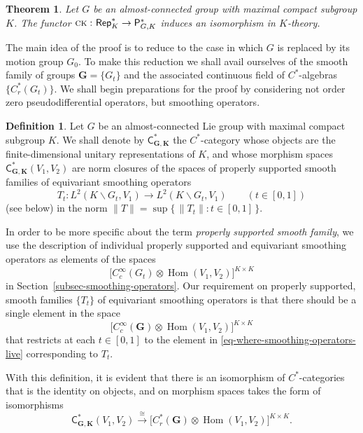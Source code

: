 \documentclass[leqno,11pt]{amsart}
\numberwithin{equation}{subsection}
\theoremstyle{plain}
\newtheorem{theorem}[equation]{Theorem}
\theoremstyle{definition}
\newtheorem{definition}[equation]{Definition}
\theoremstyle{remark}
\newcommand{\GG}{\pmb{G}}
\newcommand{\KK}{\pmb{K}}
\newcommand{\PSDO}{\mathsf{P}}
\newcommand{\CC}{\mathsf{C}}
\newcommand{\Rep}{\mathsf{Rep}}
\DeclareMathOperator{\Hom}{Hom}
\newcommand{\CoKa}{{\textsc{\textsf{ck}}}\,}
\begin{document}
\begin{theorem}
\label{thm-k-theory-of-the-c-star-category}
Let  $G$ be an almost-connected group with maximal compact subgroup $K$. The functor $\CoKa\colon \Rep^*_K \to \PSDO^*_{G,K}$ induces an isomorphism in $K$-theory.
\end{theorem}

The main idea of the proof is to reduce to the case in which  $G$   is replaced by its   motion group $G_0$. To make this reduction  we shall avail ourselves of the smooth family of groups $\GG=\{ G_t\}$ and the associated continuous field of $C^*$-algebras $\{ C^*_r (G_t)\}$.  We shall begin preparations for the proof  by considering not order zero pseudodifferential operators, but smoothing operators.  

\begin{definition}
Let $G$ be an almost-connected Lie group with maximal compact subgroup $K$.
We shall denote by $\CC^*_{\GG,\KK}$ the $C^*$-category  whose objects are the finite-dimensional unitary representations of $K$, and whose morphism spaces  $\CC^*_{\GG,\KK}(V_1,V_2)$  are norm closures of the spaces  of properly supported smooth families of equivariant smoothing operators 
\[
T_t \colon L^2 (K \backslash G_t, V_1)  \longrightarrow  L^2(K \backslash G_t, V_1)\qquad (t\in [0,1])
\]
(see below) in the norm $\| T\| = \sup\{\, \|T_t\|: t\in [0,1]\,\}$.
\end{definition}

In order to be more specific about the term \emph{properly supported smooth family}, we use the description of individual properly supported and equivariant smoothing operators as elements of the spaces 
\begin{equation}
    \label{eq-where-smoothing-operators-live}
\bigl [C_c^\infty (G_t)\otimes \Hom (V_1,V_2) \bigr ]^{K\times K}
\end{equation}
in Section~\ref{subsec-smoothing-operators}.  Our requirement on  properly supported, smooth families $\{ T_t\}$ of equivariant smoothing operators   is that there should be a single element in the space 
\[
\bigl [  C_c^\infty (\GG) \otimes \Hom (V_1,V_2)\bigr ]^{K\times K}
\]
that restricts at each $t\in [0,1]$ to the element in \eqref{eq-where-smoothing-operators-live} corresponding to $T_t$. 

With this definition, it is evident that there is an isomorphism of $C^*$-categories that is the identity on objects, and on morphism spaces takes the form of isomorphisms 
\[
\CC^*_{\GG,\KK}(V_1,V_2) \stackrel \cong \longrightarrow \bigl [   C^*_r (\GG) \otimes \Hom (V_1,V_2)\bigr ]^{K\times K}.
\]
 
\end{document}
